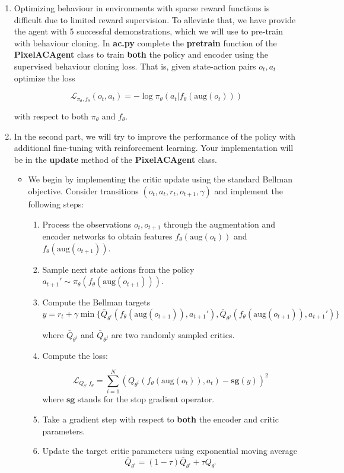 \documentclass[12pt]{article}
\begin{document}
\begin{enumerate}
\item Optimizing behaviour in environments with sparse reward functions is difficult due to limited reward supervision. To alleviate that, we have provide the agent with 5 successful demonstrations, which we will use to pre-train with behaviour cloning. In \textbf{ac.py} complete the \textbf{pretrain} function of the \textbf{PixelACAgent} class to train \textbf{both} the policy and encoder using the supervised behaviour cloning loss. That is, given state-action pairs $o_t, a_t$ optimize the loss

$$\mathcal{L}_{\pi_{\theta}, f_{\theta}}(o_t, a_t) = -\log \pi_{\theta}(a_t|f_{\theta}(\text{aug}(o_t)))$$

with respect to both $\pi_{\theta}$ and $f_{\theta}$.

\item In the second part, we will try to improve the performance of the policy with additional fine-tuning with reinforcement learning. Your implementation will be in the \textbf{update} method of the \textbf{PixelACAgent} class.

\begin{itemize}

    \item We begin by implementing the critic update using the standard Bellman objective. Consider transitions $(o_t, a_t, r_t, o_{t+1}, \gamma)$ and implement the following steps:
    \begin{enumerate}
        \item Process the observations $o_t, o_{t+1}$ through the augmentation and encoder networks to obtain features $f_{\theta}(\text{aug}(o_t))$ and $f_{\theta}(\text{aug}(o_{t+1}))$.
        \item Sample next state actions from the policy $a_{t+1}'\sim \pi_{\theta}(f_{\theta}(\text{aug}(o_{t+1})))$.
        \item Compute the Bellman targets $$y = r_t + \gamma\min\{\bar{Q}_{\theta^i}(f_{\theta}(\text{aug}(o_{t+1})), a_{t+1}'), \bar{Q}_{\theta^j}(f_{\theta}(\text{aug}(o_{t+1})), a_{t+1}')\}$$

        where $\bar{Q}_{\theta^i}$ and $\bar{Q}_{\theta^j}$ are two randomly sampled critics. 
        \item Compute the loss:
            
            $$\mathcal{L}_{Q_{\theta}, f_{\theta}} = \sum_{i=1}^N (Q_{\theta^i}(f_{\theta}(\text{aug}(o_{t})), a_t)-\mathbf{sg}(y))^2$$
        where $\mathbf{sg}$ stands for the stop gradient operator.
        \item Take a gradient step with respect to \textbf{both} the encoder and critic parameters.
        \item Update the target critic parameters using exponential moving average 
        $$\bar{Q}_{\theta^i} = (1-\tau)\bar{Q}_{\theta^i} + \tau Q_{\theta^i}$$    
    \end{enumerate}
    

\end{itemize}
\end{enumerate}
\end{document}
